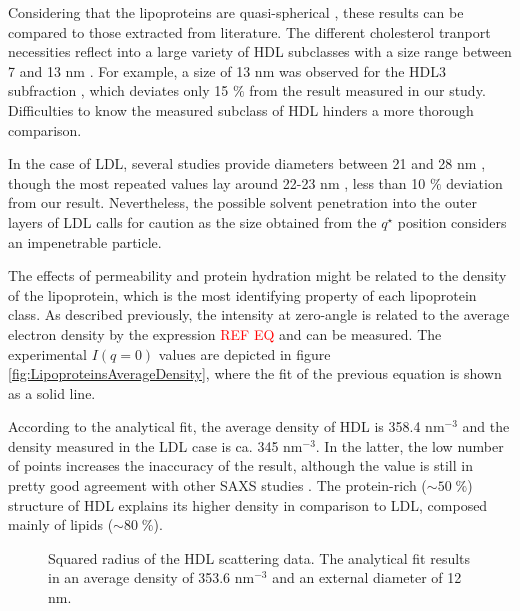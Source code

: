 Considering that the lipoproteins are quasi-spherical \cite{stuhrmann_neutron_1975}, these results can be compared to those extracted from literature. The different cholesterol tranport necessities reflect into a large variety of HDL subclasses with a size range between 7 and 13 nm \cite{german_lipoproteins:_2006}. For example, a size of 13 nm was observed for the HDL3 subfraction \cite{tardieu_structure_1976}, which deviates only 15 $\%$ from the result measured in our study. Difficulties to know the measured subclass of HDL hinders a more thorough comparison.

In the case of LDL, several studies provide diameters between 21 and 28 nm \cite{tardieu_structure_1976,colhoun_lipoprotein_2002,german_lipoproteins:_2006}, though the most repeated values lay around 22-23 nm \cite{muller_structure_1978,luzzati_structure_1979}, less than 10 $\%$ deviation from our result. Nevertheless, the possible solvent penetration into the outer layers of LDL \cite{stuhrmann_neutron_1975,tardieu_structure_1976} calls for caution as the size obtained from the $q^{\star}$ position considers an impenetrable particle.

The effects of permeability and protein hydration might be related to the density of the lipoprotein, which is the most identifying property of each lipoprotein class. As described previously, the intensity at zero-angle is related to the average electron density by the expression \textcolor{red}{REF EQ} and can be measured. The experimental $I(q=0)$ values are depicted in figure \ref{fig:LipoproteinsAverageDensity}, where the fit of the previous equation is shown as a solid line. 

According to the analytical fit, the average density of HDL is 358.4 nm$^{-3}$ and the density measured in the LDL case is ca. 345 nm$^{-3}$. In the latter, the low number of points increases the inaccuracy of the result, although the value is still in pretty good agreement with other SAXS studies \cite{tardieu_structure_1976,luzzati_structure_1979}. The protein-rich ($\sim 50 \; \% $) structure of HDL explains its higher density in comparison to LDL, composed mainly of lipids ($\sim 80 \; \% $). 

\begin{figure}
	\centering
		
		\caption{Squared radius of the HDL scattering data. The analytical fit results in an average density of 353.6 nm$^{-3}$ and an external diameter of 12 nm.}
		\label{fig:HDLGuinierRadius}
\end{figure}

